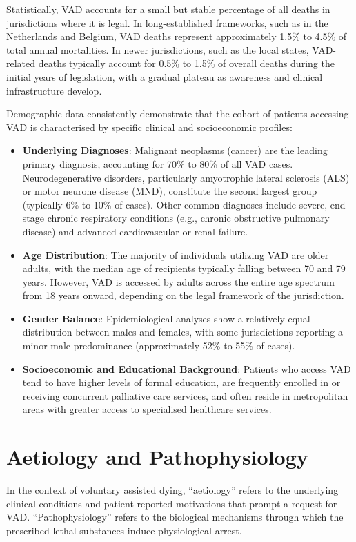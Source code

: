 Statistically, VAD accounts for a small but stable percentage of all deaths in jurisdictions where it is legal. In long-established frameworks, such as in the Netherlands and Belgium, VAD deaths represent approximately 1.5\% to 4.5\% of total annual mortalities. In newer jurisdictions, such as the local states, VAD-related deaths typically account for 0.5\% to 1.5\% of overall deaths during the initial years of legislation, with a gradual plateau as awareness and clinical infrastructure develop.

Demographic data consistently demonstrate that the cohort of patients accessing VAD is characterised by specific clinical and socioeconomic profiles:
\begin{itemize}
    \item \textbf{Underlying Diagnoses}: Malignant neoplasms (cancer) are the leading primary diagnosis, accounting for 70\% to 80\% of all VAD cases. Neurodegenerative disorders, particularly amyotrophic lateral sclerosis (ALS) or motor neurone disease (MND), constitute the second largest group (typically 6\% to 10\% of cases). Other common diagnoses include severe, end-stage chronic respiratory conditions (e.g., chronic obstructive pulmonary disease) and advanced cardiovascular or renal failure.
    \item \textbf{Age Distribution}: The majority of individuals utilizing VAD are older adults, with the median age of recipients typically falling between 70 and 79 years. However, VAD is accessed by adults across the entire age spectrum from 18 years onward, depending on the legal framework of the jurisdiction.
    \item \textbf{Gender Balance}: Epidemiological analyses show a relatively equal distribution between males and females, with some jurisdictions reporting a minor male predominance (approximately 52\% to 55\% of cases).
    \item \textbf{Socioeconomic and Educational Background}: Patients who access VAD tend to have higher levels of formal education, are frequently enrolled in or receiving concurrent palliative care services, and often reside in metropolitan areas with greater access to specialised healthcare services.
\end{itemize}

\section*{Aetiology and Pathophysiology}
In the context of voluntary assisted dying, ``aetiology'' refers to the underlying clinical conditions and patient-reported motivations that prompt a request for VAD. ``Pathophysiology'' refers to the biological mechanisms through which the prescribed lethal substances induce physiological arrest.

